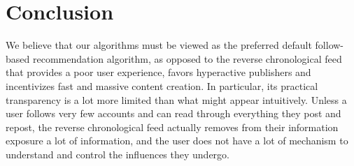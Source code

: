 \section{Conclusion}
\label{sec:conclusion}

We believe that our algorithms must be viewed 
as the preferred default follow-based recommendation algorithm,
as opposed to the reverse chronological feed
that provides a poor user experience, favors hyperactive publishers
and incentivizes fast and massive content creation.
In particular, its practical transparency is a lot more limited 
than what might appear intuitively.
Unless a user follows very few accounts 
and can read through everything they post and repost,
the reverse chronological feed actually removes from their information exposure a lot of information,
and the user does not have a lot of mechanism 
to understand and control the influences they undergo.
